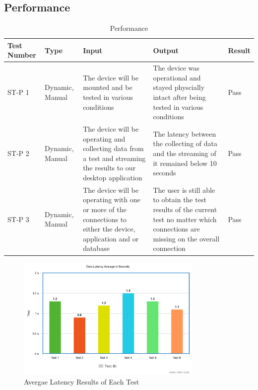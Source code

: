 \documentclass[12pt, titlepage]{article}
\begin{document}
\subsection{Performance}
\begin{table}[H]
  \begin{tabular}{| p{} | p{}| p{}| p{}| p{}|}
    \hline
    \rowcolor[gray]{0.9}
    Test Number & Type & Input & Output & Result\\
    \hline
    ST-P 1 & Dynamic, Manual & The device will be mounted and be tested in various conditions & The device was operational and stayed physcially intact after being tested in various conditions & Pass\\
    \hline
    ST-P 2 & Dynamic, Manual & The device will be operating and collecting data from a test and streaming the results to our desktop application & The latency between the collecting of data and the streaming of it remained below 10 seconds & Pass\\
    \hline
    ST-P 3 & Dynamic, Manual & The device will be operating with one or more of the connections to either the device, application and or database & The user is still able to obtain the test results of the current test no matter which connections are missing on the overall connection & Pass\\
    \hline
  \end{tabular}
  \caption{Performance}
  \end{table}

  \begin{figure}[htbp!]
    \begin{center}
    \includegraphics[width=0.8\textwidth]{Latency_Data}
    \caption{Avergae Latency Results of Each Test}
    \end{center}
    \end{figure}
\end{document}
